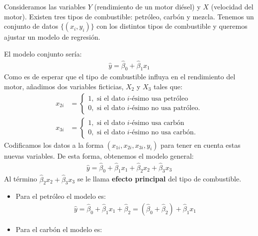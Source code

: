 \begin{ejemplo}
    Consideramos las variables $Y$ (rendimiento de un motor diésel) y $X$ (velocidad del motor).
    Existen tres tipos de combustible: petróleo, carbón y mezcla. Tenemos un conjunto de datos $\{(x_i, y_i)\}$ con los distintos tipos de combustible y queremos ajustar un modelo de regresión.

    El modelo conjunto sería:
    \begin{align*}
        \widehat{y} = \widehat{\beta}_0 + \widehat{\beta}_1x_1
    \end{align*}
    Como es de esperar que el tipo de combustible influya en el rendimiento del motor, añadimos dos variables ficticias, $X_2$ y $X_3$ tales que:
    \begin{align*}
        x_{2i} & =  \begin{cases}
                        1, \text{ si el dato $i$-ésimo usa petróleo} \\
                        0, \text{ si el dato $i$-ésimo no usa patróleo}.
                    \end{cases} \\
        x_{3i} & =  \begin{cases}
                        1, \text{ si el dato $i$-ésimo usa carbón} \\
                        0, \text{ si el dato $i$-ésimo no usa carbón}.
                    \end{cases}
    \end{align*}
    Codificamos los datos a la forma $(x_{1i}, x_{2i}, x_{3i}, y_i)$ para tener en cuenta estas nuevas variables. De esta forma, obtenemos el modelo general:
    \begin{align*}
        \widehat{y} = \widehat{\beta}_0 + \widehat{\beta}_1x_1 + \widehat{\beta}_2x_2 + \widehat{\beta}_3x_3
    \end{align*}
    Al término $\widehat{\beta}_2x_2 + \widehat{\beta}_3x_3$ se le llama \textbf{efecto principal} del tipo de combustible.
    \begin{itemize}
        \item Para el petróleo el modelo es:
              \begin{align*}
                  \widehat{y} = \widehat{\beta}_0 + \widehat{\beta}_1x_1 + \widehat{\beta}_2 = (\widehat{\beta}_0 + \widehat{\beta}_2) + \widehat{\beta}_1x_1
              \end{align*}
        \item Para el carbón el modelo es:
              \begin{align*}

\end{align*}
\end{itemize}
\end{ejemplo}
